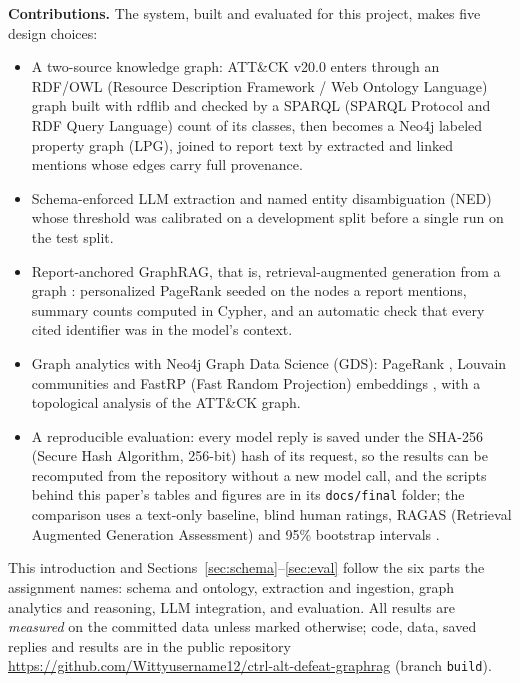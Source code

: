 \documentclass[conference,letterpaper]{IEEEtran}
\newcommand{\code}[1]{\texttt{#1}}
\begin{document}
\textbf{Contributions.} The system, built and evaluated for this project, makes five design choices:
\begin{itemize}
\item A two-source knowledge graph: ATT\&CK v20.0 enters through an RDF/OWL (Resource Description Framework / Web Ontology Language) graph built with rdflib and checked by a SPARQL (SPARQL Protocol and RDF Query Language) count of its classes, then becomes a Neo4j labeled property graph (LPG), joined to report text by extracted and linked mentions whose edges carry full provenance.
\item Schema-enforced LLM extraction and named entity disambiguation (NED) whose threshold was calibrated on a development split before a single run on the test split.
\item Report-anchored GraphRAG, that is, retrieval-augmented generation from a graph \cite{edge2024,peng2024}: personalized PageRank \cite{haveliwala2002} seeded on the nodes a report mentions, summary counts computed in Cypher, and an automatic check that every cited identifier was in the model's context.
\item Graph analytics with Neo4j Graph Data Science (GDS): PageRank \cite{brin1998}, Louvain communities \cite{blondel2008} and FastRP (Fast Random Projection) embeddings \cite{chen2019}, with a topological analysis of the ATT\&CK graph.
\item A reproducible evaluation: every model reply is saved under the \mbox{SHA-256} (Secure Hash Algorithm, 256-bit) hash of its request, so the results can be recomputed from the repository without a new model call, and the scripts behind this paper's tables and figures are in its \code{docs/final} folder; the comparison uses a text-only baseline, blind human ratings, RAGAS (Retrieval Augmented Generation Assessment) \cite{es2024} and 95\% bootstrap intervals \cite{efron1993}.
\end{itemize}
This introduction and Sections~\ref{sec:schema}--\ref{sec:eval} follow the six parts the assignment names: schema and ontology, extraction and ingestion, graph analytics and reasoning, LLM integration, and evaluation. All results are \emph{measured} on the committed data unless marked otherwise; code, data, saved replies and results are in the public repository \url{https://github.com/Wittyusername12/ctrl-alt-defeat-graphrag} (branch \code{build}).

\end{document}
